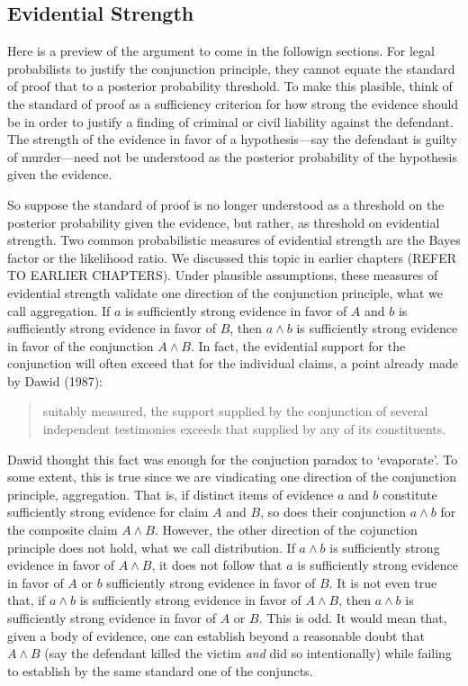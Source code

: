 \documentclass[10pt,dvipsnames,enabledeprecatedfontcommands]{scrartcl}
\begin{document}
\hypertarget{evidential-strength}{%
\subsection{Evidential Strength}\label{evidential-strength}}

Here is a preview of the argument to come in the followign sections. For
legal probabilists to justify the conjunction principle, they cannot
equate the standard of proof that to a posterior probability threshold.
To make this plasible, think of the standard of proof as a sufficiency
criterion for how strong the evidence should be in order to justify a
finding of criminal or civil liability against the defendant. The
strength of the evidence in favor of a hypothesis---say the defendant is
guilty of murder---need not be understood as the posterior probability
of the hypothesis given the evidence.

So suppose the standard of proof is no longer understood as a threshold
on the posterior probability given the evidence, but rather, as
threshold on evidential strength. Two common probabilistic measures of
evidential strength are the Bayes factor or the likelihood ratio. We
discussed this topic in earlier chapters (REFER TO EARLIER CHAPTERS).
Under plausible assumptions, these measures of evidential strength
validate one direction of the conjunction principle, what we call
aggregation. If \(a\) is sufficiently strong evidence in favor of \(A\)
and \(b\) is sufficiently strong evidence in favor of \(B\), then
\(a\wedge b\) is sufficiently strong evidence in favor of the
conjunction \(A \wedge B\). In fact, the evidential support for the
conjunction will often exceed that for the individual claims, a point
already made by Dawid (1987):

\begin{quote} suitably measured, the support  supplied by the conjunction of several independent testimonies exceeds that supplied by any of its constituents.
 \end{quote}

\noindent Dawid thought this fact was enough for the conjuction paradox
to `evaporate'. To some extent, this is true since we are vindicating
one direction of the conjunction principle, aggregation. That is, if
distinct items of evidence \(a\) and \(b\) constitute sufficiently
strong evidence for claim \(A\) and \(B\), so does their conjunction
\(a\wedge b\) for the composite claim \(A\wedge B\). However, the other
direction of the cojunction principle does not hold, what we call
distribution. If \(a \wedge b\) is sufficiently strong evidence in favor
of \(A \wedge B\), it does not follow that \(a\) is sufficiently strong
evidence in favor of \(A\) or \(b\) sufficiently strong evidence in
favor of \(B\). It is not even true that, if \(a \wedge b\) is
sufficiently strong evidence in favor of \(A \wedge B\), then
\(a\wedge b\) is sufficiently strong evidence in favor of \(A\) or
\(B\). This is odd. It would mean that, given a body of evidence, one
can establish beyond a reasonable doubt that \(A \wedge B\) (say the
defendant killed the victim \textit{and} did so intentionally) while
failing to establish by the same standard one of the conjuncts.
\end{document}
